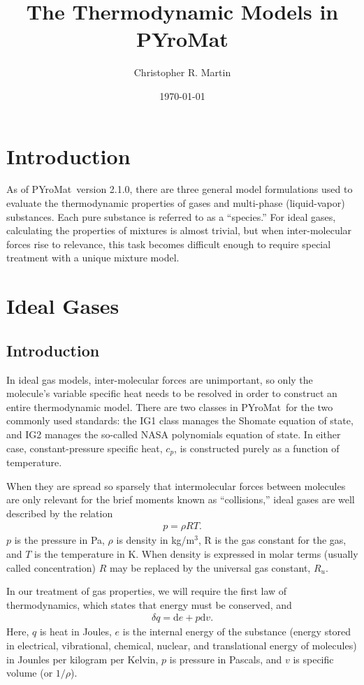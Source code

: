 \documentclass[letterpaper,11pt]{article}
\title{The Thermodynamic Models in PYroMat}
\author{Christopher R. Martin}
\date{\today}
\newcommand{\PM}{PYroMat}
\def\d{\mathrm{d}}
\begin{document}
\maketitle

\section{Introduction}

As of \PM\ version 2.1.0, there are three general model formulations used to evaluate the thermodynamic properties of gases and multi-phase (liquid-vapor) substances.  Each pure substance is referred to as a ``species.''  For ideal gases, calculating the properties of mixtures is almost trivial, but when inter-molecular forces rise to relevance, this task becomes difficult enough to require special treatment with a unique mixture model.

\section{Ideal Gases}

\subsection{Introduction}

In ideal gas models, inter-molecular forces are unimportant, so only the molecule's variable specific heat needs to be resolved in order to construct an entire thermodynamic model.  There are two classes in \PM\ for the two commonly used standards: the IG1 class manages the Shomate equation of state, and IG2 manages the so-called NASA polynomials equation of state.  In either case, constant-pressure specific heat, $c_p$, is constructed purely as a function of temperature.

When they are spread so sparsely that intermolecular forces between molecules are only relevant for the brief moments known as ``collisions,'' ideal gases are well described by the relation
\begin{align}
p = \rho R T.
\end{align}
$p$ is the pressure in Pa, $\rho$ is density in kg/m$^3$, R is the gas constant for the gas, and $T$ is the temperature in K.  When density is expressed in molar terms (usually called concentration) $R$ may be replaced by the universal gas constant, $R_u$.

In our treatment of gas properties, we will require the first law of thermodynamics, which states that energy must be conserved, and
\begin{align}
\delta q = \d e + p\d v.
\end{align}
Here, $q$ is heat in Joules, $e$ is the internal energy of the substance (energy stored in electrical, vibrational, chemical, nuclear, and translational energy of molecules) in Jounles per kilogram per Kelvin, $p$ is pressure in Pascals, and $v$ is specific volume (or $1/\rho$).  
\end{document}
